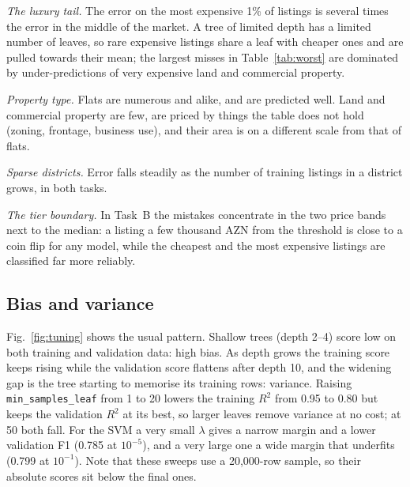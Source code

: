 \documentclass[10pt,twocolumn,a4paper]{article}
\newcommand{\gentable}[1]{\resizebox{\ifdim\width>\linewidth\linewidth\else\width\fi}{!}{}}
\begin{document}
\textit{The luxury tail.} The error on the most expensive 1\% of listings
is several times the error in the middle of the market. A tree of limited
depth has a limited number of leaves, so rare expensive listings share a
leaf with cheaper ones and are pulled towards their mean; the largest
misses in Table~\ref{tab:worst} are dominated by under-predictions of very
expensive land and commercial property.

\textit{Property type.} Flats are numerous and alike, and are predicted
well. Land and commercial property are few, are priced by things the
table does not hold (zoning, frontage, business use), and their area is
on a different scale from that of flats.

\textit{Sparse districts.} Error falls steadily as the number of training
listings in a district grows, in both tasks.

\textit{The tier boundary.} In Task~B the mistakes concentrate in the two
price bands next to the median: a listing a few thousand AZN from the
threshold is close to a coin flip for any model, while the cheapest and
the most expensive listings are classified far more reliably.

\begin{table}[t]
  \centering
  \caption{Task A: mean absolute error on the log price, test split.}
  \label{tab:errorsA}
  \gentable{errors_task_a}
\end{table}

\begin{table}[t]
  \centering
  \caption{Task B: share of wrong tier calls, test split.}
  \label{tab:errorsB}
  \gentable{errors_task_b}
\end{table}

\begin{table}[t]
  \centering
  \caption{The ten largest price errors on the test split, Task A.}
  \label{tab:worst}
  \gentable{worst_misses}
\end{table}

\subsection{Bias and variance}
Fig.~\ref{fig:tuning} shows the usual pattern. Shallow
trees (depth 2--4) score low on both training and validation data: high
bias. As depth grows the training score keeps rising while the validation
score flattens after depth 10, and the widening gap is the tree starting
to memorise its training rows: variance. Raising \texttt{min\_samples\_leaf}
from 1 to 20 lowers the training $R^2$ from 0.95 to 0.80 but keeps the
validation $R^2$ at its best, so larger leaves remove variance at no cost;
at 50 both fall. For the SVM a very small $\lambda$ gives a narrow margin
and a lower validation F1 (0.785 at $10^{-5}$), and a very large one a
wide margin that underfits (0.799 at $10^{-1}$). Note that these sweeps use
a 20{,}000-row sample, so their absolute scores sit below the final ones.
\end{document}
